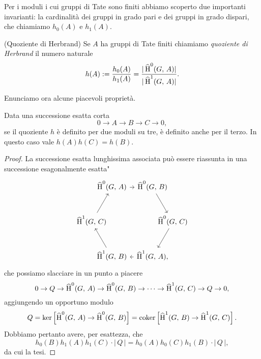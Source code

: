 Per i moduli i cui gruppi di Tate sono finiti abbiamo scoperto due importanti invarianti: la cardinalità dei gruppi in grado pari e dei gruppi in grado dispari, che chiamiamo $ h_0(A) $ e $ h_1(A) $.

\begin{definition}(Quoziente di Herbrand)
	Se $ A $ ha gruppi di Tate finiti chiamiamo \emph{quoziente di Herbrand} il numero naturale
	\[ {h}(A) := \frac{h_0(A)}{h_1(A)} = \frac{|\operatorname{\widehat{H}}^0(G, \, A)|}{|\operatorname{\widehat{H}}^1(G, \, A)|}. \]
\end{definition}

Enunciamo ora alcune piacevoli proprietà.

\begin{lemma}\label{Herb1}
	Data una successione esatta corta
	\[ 0 \to A \to B \to C \to 0, \]
	se il quoziente $ h $ è definito per due moduli su tre, è definito anche per il terzo. In questo caso vale $ h(A)h(C) = h(B) $.
\end{lemma}
\begin{proof}
	La successione esatta lunghissima associata può essere riassunta in una successione \leftquote esagonalmente esatta"
	\[\begin{tikzcd}[column sep={1cm,between origins}, row sep={1.732050808cm,between origins}]
	& \Hh^0(G, \, A) \arrow[rr] && \Hh^0(G, \, B) \arrow[rd] &  \\
	\Hh^1(G, \, C) \arrow[ru]&  &&  & \Hh^0(G, \, C) \arrow[ld] \\				& \Hh^1(G, \, B) \arrow[lu] && \Hh^1(G, \, A) \arrow[ll], & 
	\end{tikzcd}\]
	che possiamo slacciare in un punto a piacere
	\[ 0 \to Q \to \operatorname{\widehat{H}}^0(G, \, A) \to \operatorname{\widehat{H}}^0(G, \, B) \to \dots \to \operatorname{\widehat{H}}^1(G, \, C) \to Q \to 0, \]
	aggiungendo un opportuno modulo $$  Q = \ker \left[\operatorname{\widehat{H}}^0(G, \, A) \to \operatorname{\widehat{H}}^0(G, \, B)\right] = \operatorname{coker}\left[ \operatorname{\widehat{H}}^1(G, \, B) \to \operatorname{\widehat{H}}^1(G, \, C) \right].  $$
	Dobbiamo pertanto avere, per esattezza, che
	\[  h_0(B) h_1(A) h_1(C) \cdot |\,Q\,| = h_0(A) h_0(C) h_1(B) \cdot |\,Q\,|, \]			da cui la tesi.
\end{proof}

